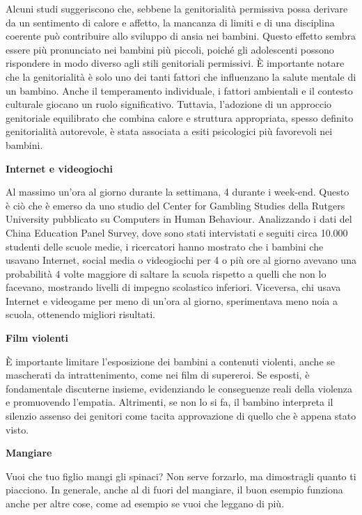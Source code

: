 \documentclass[12pt]{book} %
\begin{document}
Alcuni studi   suggeriscono che, sebbene la genitorialità permissiva possa derivare da un sentimento di calore e affetto, la mancanza di limiti e di una disciplina coerente può contribuire allo sviluppo di ansia nei bambini. Questo effetto sembra essere più pronunciato nei bambini più piccoli, poiché gli adolescenti possono rispondere in modo diverso agli stili genitoriali permissivi. È importante notare che la genitorialità è solo uno dei tanti fattori che influenzano la salute mentale di un bambino. Anche il temperamento individuale, i fattori ambientali e il contesto culturale giocano un ruolo significativo. Tuttavia, l'adozione di un approccio genitoriale equilibrato che combina calore e struttura appropriata, spesso definito genitorialità autorevole, è stata associata a esiti psicologici più favorevoli nei bambini.

\textbf{Internet e videogiochi}

Al massimo un'ora al giorno durante la settimana, 4 durante i week-end. Questo è ciò che è emerso da uno studio del
Center for Gambling Studies della Rutgers University pubblicato su Computers in Human Behaviour. Analizzando i dati del
China Education Panel Survey, dove sono stati intervistati e seguiti circa 10.000 studenti delle scuole medie, i
ricercatori hanno mostrato che i bambini che usavano Internet, social media o videogiochi per 4 o più ore al giorno
avevano una probabilità 4 volte maggiore di saltare la scuola rispetto a quelli che non lo facevano, mostrando livelli
di impegno scolastico inferiori. Viceversa, chi usava Internet e videogame per meno di un'ora al giorno, sperimentava
meno noia a scuola, ottenendo migliori risultati. 

\textbf{Film violenti}

È importante limitare l’esposizione dei bambini a contenuti violenti, anche se mascherati da intrattenimento, come nei film di supereroi. Se esposti, è fondamentale discuterne insieme, evidenziando le conseguenze reali della violenza e promuovendo l’empatia. Altrimenti, se non lo si fa, il bambino interpreta il silenzio assenso dei
genitori come tacita approvazione di quello che è appena stato visto.

\textbf{Mangiare}

Vuoi che tuo figlio mangi gli spinaci? Non serve forzarlo, ma dimostragli quanto ti piacciono. In generale, anche al di
fuori del mangiare, il buon esempio funziona anche per altre cose, come ad esempio se vuoi che leggano di più.
\end{document}
